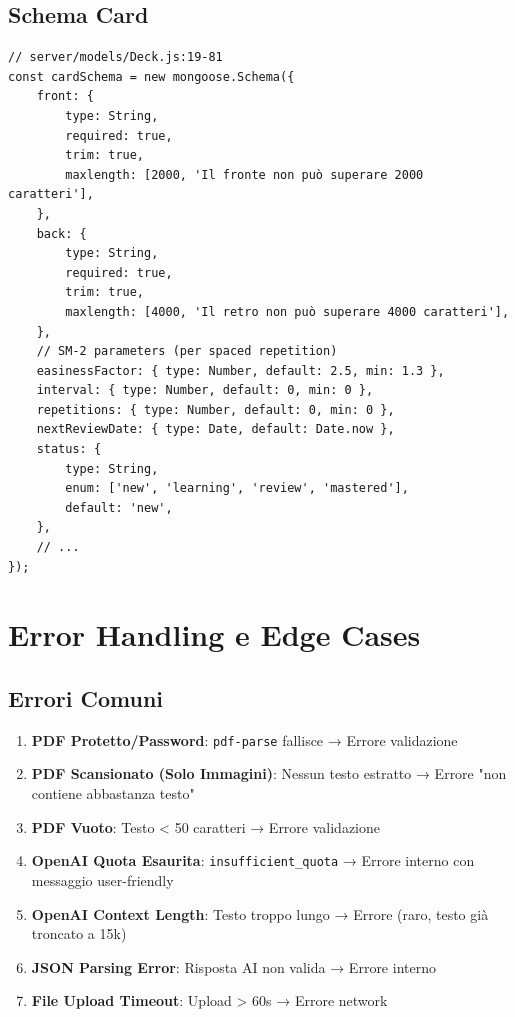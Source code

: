 \documentclass[11pt,a4paper]{article}
\begin{document}
\subsection{Schema Card}

\begin{lstlisting}[caption=Schema Card - Flashcard Generata]
// server/models/Deck.js:19-81
const cardSchema = new mongoose.Schema({
    front: {
        type: String,
        required: true,
        trim: true,
        maxlength: [2000, 'Il fronte non può superare 2000 caratteri'],
    },
    back: {
        type: String,
        required: true,
        trim: true,
        maxlength: [4000, 'Il retro non può superare 4000 caratteri'],
    },
    // SM-2 parameters (per spaced repetition)
    easinessFactor: { type: Number, default: 2.5, min: 1.3 },
    interval: { type: Number, default: 0, min: 0 },
    repetitions: { type: Number, default: 0, min: 0 },
    nextReviewDate: { type: Date, default: Date.now },
    status: {
        type: String,
        enum: ['new', 'learning', 'review', 'mastered'],
        default: 'new',
    },
    // ...
});
\end{lstlisting}

\section{Error Handling e Edge Cases}

\subsection{Errori Comuni}

\begin{enumerate}
    \item \textbf{PDF Protetto/Password}: \texttt{pdf-parse} fallisce → Errore validazione
    \item \textbf{PDF Scansionato (Solo Immagini)}: Nessun testo estratto → Errore "non contiene abbastanza testo"
    \item \textbf{PDF Vuoto}: Testo < 50 caratteri → Errore validazione
    \item \textbf{OpenAI Quota Esaurita}: \texttt{insufficient\_quota} → Errore interno con messaggio user-friendly
    \item \textbf{OpenAI Context Length}: Testo troppo lungo → Errore (raro, testo già troncato a 15k)
    \item \textbf{JSON Parsing Error}: Risposta AI non valida → Errore interno
    \item \textbf{File Upload Timeout}: Upload > 60s → Errore network
\end{enumerate}
\end{document}
